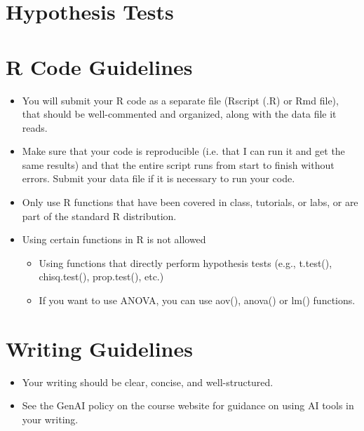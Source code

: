 \documentclass[12pt]{article}
\begin{document}
\section*{Hypothesis Tests}


\section*{R Code Guidelines}
\begin{itemize}
    \item You will submit your R code as a separate file (Rscript (.R) or Rmd file), that should be well-commented and organized, along with the data file it reads.
    \item Make sure that your code is reproducible (i.e. that I can run it and get the same results) and that the entire script runs from start to finish without errors. Submit your data file if it is necessary to run your code.
    \item Only use R functions that have been covered in class, tutorials, or labs, or are part of the standard R distribution.
    \item Using certain functions in R is not allowed
    \begin{itemize}
        \item Using functions that directly perform hypothesis tests (e.g., t.test(), chisq.test(), prop.test(), etc.)
        \item If you want to use ANOVA, you can use aov(), anova() or lm() functions.
    \end{itemize}
\end{itemize}

\section*{Writing Guidelines}
\begin{itemize}
    \item Your writing should be clear, concise, and well-structured.
    \item See the GenAI policy on the course website for guidance on using AI tools in your writing.
\end{itemize}
\end{document}

